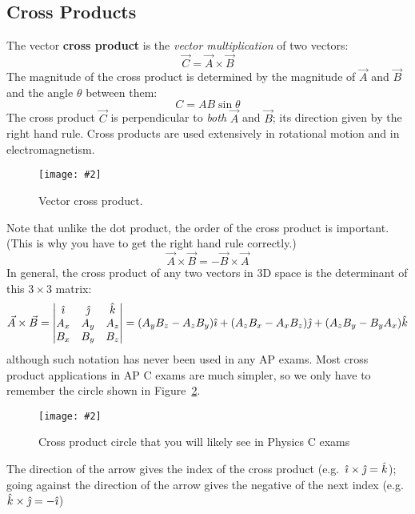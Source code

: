 \documentclass{../../oss-handout}
\newcommand{\iii}{\ensuremath\hat\imath}
\newcommand{\jjj}{\ensuremath\hat\jmath}
\newcommand{\kkk}{\ensuremath{\hat k}}
\newcommand{\pic}[2]{\texttt{[image: \#2]}}
\begin{document}
\subsection{Cross Products}
The vector \textbf{cross product} is the \emph{vector multiplication} of two
vectors:
\begin{equation*}
  \vec C=\vec A\times\vec B
\end{equation*}
The magnitude of the cross product is determined by the magnitude of $\vec A$
and $\vec B$ and the angle $\theta$ between them:
\begin{equation*}
  C=AB\sin\theta
\end{equation*}
The cross product $\vec C$ is perpendicular to \emph{both} $\vec A$ and
$\vec B$; its direction given by the right hand rule. Cross products are used
extensively in rotational motion and in electromagnetism.
\begin{figure}[ht]
  \centering
  \pic{.3}{cross-product.png}
  \caption{Vector cross product.}
  \label{fig:cross1}
\end{figure}
Note that unlike the dot product, the order of the cross product is important.
(This is why you have to get the right hand rule correctly.)
\begin{equation*}
  \vec A\times\vec B=-\vec B\times\vec A
\end{equation*}
In general, the cross product of any two vectors in 3D space is the determinant
of this $3\times 3$ matrix:
\begin{equation*}
  \vec A\times\vec B=
  \left|
  \begin{matrix}
    \iii & \jjj & \kkk \\
    A_x & A_y & A_z\\
    B_x & B_y & B_z
  \end{matrix}
  \right|
  =(A_yB_z-A_zB_y)\iii +
  (A_zB_x-A_xB_z)\jjj +
  (A_zB_y-B_yA_x)\kkk
\end{equation*}
although such notation
has never been used in any AP exams. Most cross product
applications in AP C exams are much simpler, so we
only have to remember the circle shown in Figure~\ref{fig:cross2}.
\begin{figure}[ht]
  \centering
  \pic{.12}{cross-product-circle}
  \caption{Cross product circle that you will likely see in Physics C exams}
  \label{fig:cross2}
\end{figure}

The direction of the arrow gives the index of the cross product (e.g.\
$\iii\times\jjj=\kkk$); going against the direction of the arrow gives the
negative of the next index (e.g.\ $\kkk\times\jjj=-\iii$)
\end{document}
